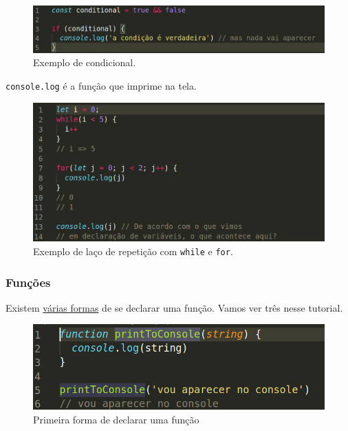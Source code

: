 \begin{figure}[h!]
    \centering
    \includegraphics[scale=.4]{imgs/conditional.png}
    \caption{Exemplo de condicional.}
    \label{fig:conditional}
\end{figure}

 \texttt{console.log} é a função que imprime na tela.

\begin{figure}[h!]
    \centering
    \includegraphics[scale=.4]{imgs/loops.png}
    \caption{Exemplo de laço de repetição com \texttt{while} e \texttt{for}.}
    \label{fig:loops}
\end{figure}


\newpage
\subsubsection{Funções}
Existem 
\href{https://developer.mozilla.org/en-US/docs/Web/JavaScript/Reference/Functions}{várias formas}  
de se declarar uma função. Vamos ver três nesse tutorial.

\begin{figure}[h!]
    \centering
    \includegraphics[scale=.4]{imgs/function1.png}
    \caption{ Primeira forma de declarar uma função }
    \label{fig:function1}
\end{figure}

